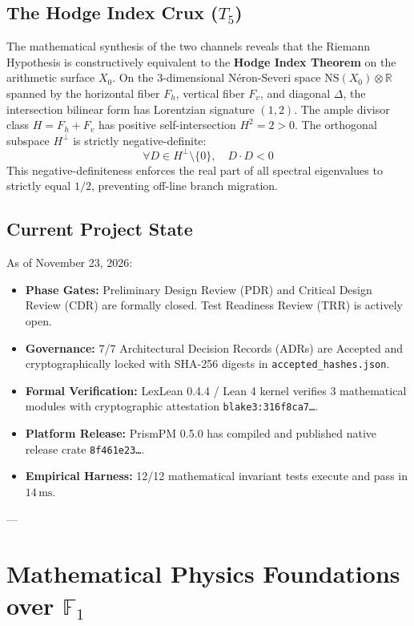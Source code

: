 \documentclass[11pt,a4paper]{article}
\theoremstyle{definition}
\theoremstyle{remark}
\begin{document}
\subsection{The Hodge Index Crux \texorpdfstring{($T_5$)}{(T5)}}
The mathematical synthesis of the two channels reveals that the Riemann Hypothesis is constructively equivalent to the \textbf{Hodge Index Theorem} on the arithmetic surface $X_0$. On the 3-dimensional N\'eron-Severi space $\mathrm{NS}(X_0) \otimes \mathbb{R}$ spanned by the horizontal fiber $F_h$, vertical fiber $F_v$, and diagonal $\Delta$, the intersection bilinear form has Lorentzian signature $(1, 2)$. The ample divisor class $H = F_h + F_v$ has positive self-intersection $H^2 = 2 > 0$. The orthogonal subspace $H^\perp$ is strictly negative-definite:
\begin{equation}
\forall D \in H^\perp \setminus \{0\}, \quad D \cdot D < 0
\end{equation}
This negative-definiteness enforces the real part of all spectral eigenvalues to strictly equal $1/2$, preventing off-line branch migration.

\subsection{Current Project State}
As of November 23, 2026:
\begin{itemize}
    \item \textbf{Phase Gates:} Preliminary Design Review (PDR) and Critical Design Review (CDR) are formally closed. Test Readiness Review (TRR) is actively open.
    \item \textbf{Governance:} 7/7 Architectural Decision Records (ADRs) are Accepted and cryptographically locked with SHA-256 digests in \texttt{accepted\_hashes.json}.
    \item \textbf{Formal Verification:} LexLean 0.4.4 / Lean 4 kernel verifies 3 mathematical modules with cryptographic attestation \texttt{blake3:316f8ca7\dots}.
    \item \textbf{Platform Release:} PrismPM 0.5.0 has compiled and published native release crate \texttt{8f461e23\dots}.
    \item \textbf{Empirical Harness:} 12/12 mathematical invariant tests execute and pass in $14\,\mathrm{ms}$.
\end{itemize}

---

\section{Mathematical Physics Foundations over \texorpdfstring{$\mathbb{F}_1$}{F1}}
\end{document}
